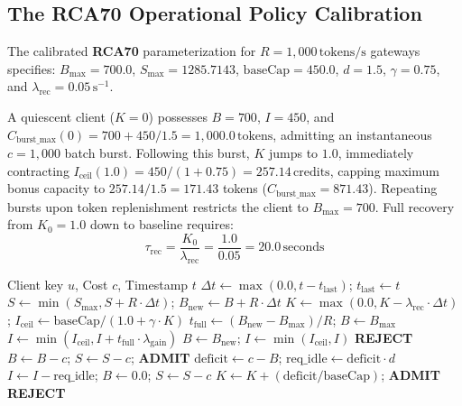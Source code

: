 \documentclass[conference]{IEEEtran}
\begin{document}
\subsection{The RCA70 Operational Policy Calibration}
The calibrated \textbf{RCA70} parameterization for $R = 1,000\,\text{tokens/s}$ gateways specifies: $B_{\max} = 700.0$, $S_{\max} = 1285.7143$, $\text{baseCap} = 450.0$, $d = 1.5$, $\gamma = 0.75$, and $\lambda_{\text{rec}} = 0.05\,\text{s}^{-1}$. 

A quiescent client ($K = 0$) possesses $B = 700$, $I = 450$, and $C_{\text{burst\_max}}(0) = 700 + 450/1.5 = 1,000.0\,\text{tokens}$, admitting an instantaneous $c = 1,000$ batch burst. Following this burst, $K$ jumps to $1.0$, immediately contracting $I_{\text{ceil}}(1.0) = 450 / (1 + 0.75) = 257.14\,\text{credits}$, capping maximum bonus capacity to $257.14 / 1.5 = 171.43$ tokens ($C_{\text{burst\_max}} = 871.43$). Repeating bursts upon token replenishment restricts the client to $B_{\max} = 700$. Full recovery from $K_0 = 1.0$ down to baseline requires:
\begin{equation}
\tau_{\text{rec}} = \frac{K_0}{\lambda_{\text{rec}}} = \frac{1.0}{0.05} = 20.0\,\text{seconds}
\end{equation}

\begin{algorithm}[t]
\caption{DREB-RCA70 Atomic Admission Control}
\label{alg:dreb}
\begin{algorithmic}[1]
\REQUIRE Client key $u$, Cost $c$, Timestamp $t$
\STATE $\Delta t \leftarrow \max(0.0, t - t_{\text{last}})$; \quad $t_{\text{last}} \leftarrow t$
\STATE $S \leftarrow \min(S_{\max}, S + R \cdot \Delta t)$; \quad $B_{\text{new}} \leftarrow B + R \cdot \Delta t$
\STATE $K \leftarrow \max(0.0, K - \lambda_{\text{rec}} \cdot \Delta t)$; \quad $I_{\text{ceil}} \leftarrow \text{baseCap} / (1.0 + \gamma \cdot K)$
    \STATE $t_{\text{full}} \leftarrow (B_{\text{new}} - B_{\max}) / R$; \quad $B \leftarrow B_{\max}$
    \STATE $I \leftarrow \min(I_{\text{ceil}}, I + t_{\text{full}} \cdot \lambda_{\text{gain}})$
\ELSE
    \STATE $B \leftarrow B_{\text{new}}$; \quad $I \leftarrow \min(I_{\text{ceil}}, I)$
\ENDIF
{}
    \RETURN \textbf{REJECT}
\ENDIF
{}
    \STATE $B \leftarrow B - c$; \quad $S \leftarrow S - c$; \quad \RETURN \textbf{ADMIT}
\ELSE
    \STATE $\text{deficit} \leftarrow c - B$; \quad $\text{req\_idle} \leftarrow \text{deficit} \cdot d$
        \STATE $I \leftarrow I - \text{req\_idle}$; \quad $B \leftarrow 0.0$; \quad $S \leftarrow S - c$
        \STATE $K \leftarrow K + (\text{deficit} / \text{baseCap})$; \quad \RETURN \textbf{ADMIT}
    \ELSE
        \RETURN \textbf{REJECT}
    \ENDIF
\ENDIF
\end{algorithmic}
\end{algorithm}
\end{document}
